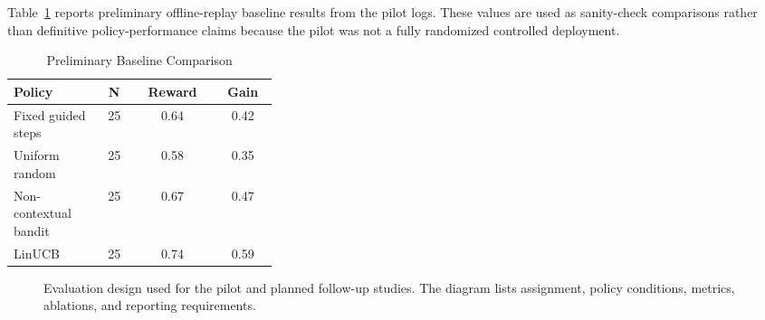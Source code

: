 \documentclass[conference]{IEEEtran}
\begin{document}
Table~\ref{tab:baseline-results} reports preliminary offline-replay baseline results from the pilot logs. These values are used as sanity-check comparisons rather than definitive policy-performance claims because the pilot was not a fully randomized controlled deployment.

\begin{table}[htbp]
\caption{Preliminary Baseline Comparison}
\label{tab:baseline-results}
\centering
\begin{tabular}{p{0.34\linewidth}ccc}
\toprule
\textbf{Policy} & \textbf{N} & \textbf{Reward} & \textbf{Gain} \\
\midrule
Fixed guided steps & 25 & 0.64 & 0.42 \\
Uniform random & 25 & 0.58 & 0.35 \\
Non-contextual bandit & 25 & 0.67 & 0.47 \\
LinUCB & 25 & 0.74 & 0.59 \\
\bottomrule
\end{tabular}
\end{table}

\begin{figure}[htbp]
\centering
{}
\caption{Evaluation design used for the pilot and planned follow-up studies. The diagram lists assignment, policy conditions, metrics, ablations, and reporting requirements.}
\label{fig:evaluation-design}
\end{figure}
\FloatBarrier
\end{document}
